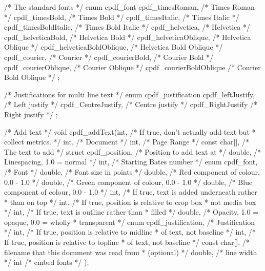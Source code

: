 /* The standard fonts */
enum cpdf_font {
  cpdf_timesRoman,           /* Times Roman */
  cpdf_timesBold,            /* Times Bold */
  cpdf_timesItalic,          /* Times Italic */
  cpdf_timesBoldItalic,      /* Times Bold Italic */
  cpdf_helvetica,            /* Helvetica */
  cpdf_helveticaBold,        /* Helvetica Bold */
  cpdf_helveticaOblique,     /* Helvetica Oblique */
  cpdf_helveticaBoldOblique, /* Helvetica Bold Oblique */
  cpdf_courier,              /* Courier */
  cpdf_courierBold,          /* Courier Bold */
  cpdf_courierOblique,       /* Courier Oblique */
  cpdf_courierBoldOblique    /* Courier Bold Oblique */
};

/* Justifications for multi line text */
enum cpdf_justification {
  cpdf_leftJustify,   /* Left justify */
  cpdf_CentreJustify, /* Centre justify */
  cpdf_RightJustify   /* Right justify */
};

/* Add text */
void cpdf_addText(int,                  /* If true, don't actually add text but
                                         * collect metrics. */
                  int,                  /* Document */
                  int,                  /* Page Range */
                  const char[],         /* The text to add */
                  struct cpdf_position, /* Position to add text at */
                  double,               /* Linespacing, 1.0 = normal */
                  int,                  /* Starting Bates number */
                  enum cpdf_font,       /* Font */
                  double,               /* Font size in points */
                  double,               /* Red component of colour, 0.0 - 1.0 */
                  double, /* Green component of colour, 0.0 - 1.0 */
                  double, /* Blue component of colour, 0.0 - 1.0 */
                  int,    /* If true, text is added underneath rather
                           * than on top */
                  int,    /* If true, position is relative to crop box
                           * not media box */
                  int,    /* If true, text is outline rather than
                           * filled */
                  double, /* Opacity, 1.0 = opaque, 0.0 = wholly
                           * transparent */
                  enum cpdf_justification, /* Justification */
                  int,          /* If true, position is relative to midline
                                 * of text, not baseline */
                  int,          /* If true, position is relative to topline
                                 * of text, not baseline */
                  const char[], /* filename that this document was read from
                                 * (optional) */
                  double,       /* line width */
                  int           /* embed fonts */
);

